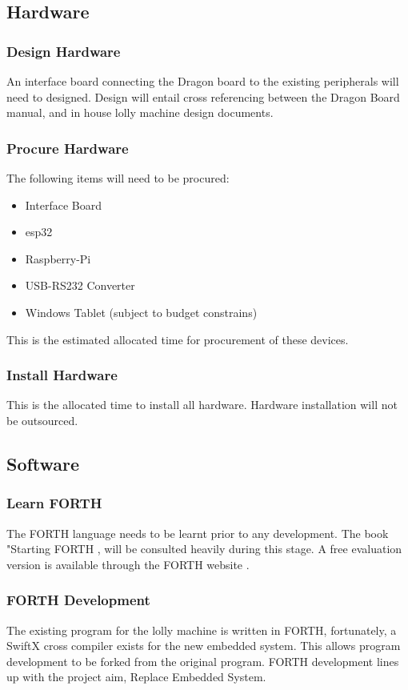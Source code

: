\subsection{Hardware}
    \subsubsection{Design Hardware}
        An interface board connecting the Dragon board to the existing peripherals will need to designed. Design will entail cross referencing between the Dragon Board manual, \cite{dragonBoard} and in house lolly machine design documents.
    \subsubsection{Procure Hardware}
        The following items will need to be procured:
        \begin{itemize}
            \item {Interface Board}
            \item {esp32}
            \item {Raspberry-Pi}
            \item {USB-RS232 Converter}
            \item {Windows Tablet (subject to budget constrains)}
        \end{itemize}
        This is the estimated allocated time for procurement of these devices.
    \subsubsection{Install Hardware}
        This is the allocated time to install all hardware. Hardware installation will not be outsourced.
        
\subsection{Software}
    \subsubsection{Learn FORTH}
        The FORTH language needs to be learnt prior to any development. The book "Starting FORTH \cite{startingForth}, will be consulted heavily during this stage. A free evaluation version is available through the FORTH website \cite{forthWeb}.
    \subsubsection{FORTH Development}
        The existing program for the lolly machine is written in FORTH, fortunately, a SwiftX cross compiler exists for the new embedded system. This allows program development to be forked from the original program. FORTH development lines up with the project aim, Replace Embedded System.
